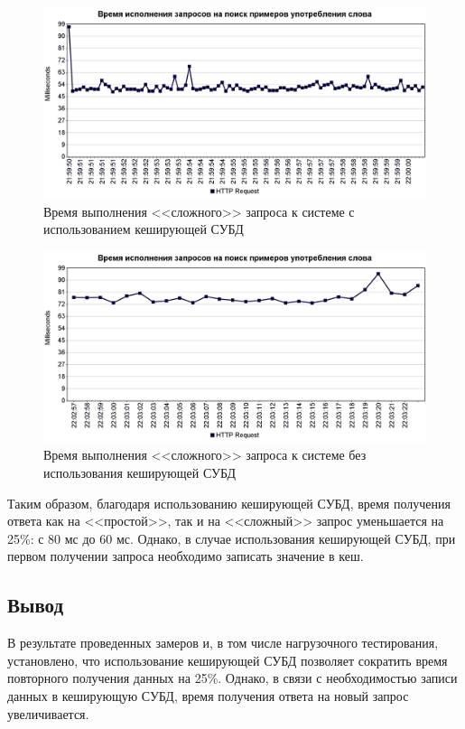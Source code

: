 \begin{figure}[ht]
	\centering
	\includegraphics[scale=0.35]{img/plots/http-complex-with-cache}
	\caption{Время выполнения <<сложного>> запроса к системе с использованием кеширующей СУБД}
	\label{http-complex-with-cache}
\end{figure}

\begin{figure}[ht]
	\centering
	\includegraphics[scale=0.35]{img/plots/http-complex-no-cache}
	\caption{Время выполнения <<сложного>> запроса к системе без использования кеширующей СУБД}
	\label{http-complex-no-cache}
\end{figure}\clearpage

Таким образом, благодаря использованию кеширующей СУБД, время получения ответа как на <<простой>>, так и на <<сложный>> запрос уменьшается на 25\%: с 80 мс до 60 мс. 
Однако, в случае использования кеширующей СУБД, при первом получении запроса необходимо записать значение в кеш.

\subsection*{Вывод}

В результате проведенных замеров и, в том числе нагрузочного тестирования, установлено, что использование кеширующей СУБД позволяет сократить время повторного получения данных на 25\%. 
Однако, в связи с необходимостью записи данных в кеширующую СУБД, время получения ответа на новый запрос увеличивается.

\pagebreak